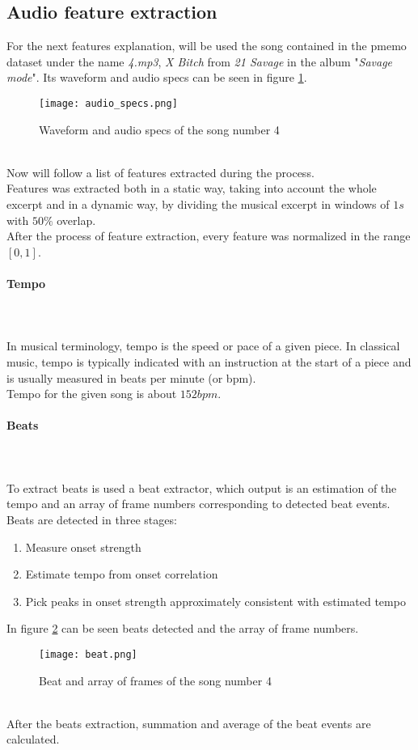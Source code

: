 \subsection{Audio feature extraction}
For the next features explanation, will be used the song contained in the \gls{pmemo} dataset under the name \textit{4.mp3}, \textit{X Bitch} from \textit{21 Savage} in the album "\textit{Savage mode}". Its waveform and audio specs can be seen in figure \ref{fig:audio_specs}.
\begin{figure}[h]
    \centering
    \texttt{[image: audio\_specs.png]} 
	\caption{Waveform and audio specs of the song number 4}
    \label{fig:audio_specs}
\end{figure}
\\
Now will follow a list of features extracted during the process.
\\
Features was extracted both in a static way, taking into account the whole excerpt and in a dynamic way, by dividing the musical excerpt in windows of $1s$ with $50\%$ overlap.
\\
After the process of feature extraction, every feature was normalized in the range $[0,1]$.
\paragraph{Tempo}
\mbox{} \\ \\
In musical terminology, tempo  is the speed or pace of a given piece. In classical music, tempo is typically indicated with an instruction at the start of a piece and is usually measured in beats per minute (or bpm).
\\
Tempo for the given song is about $152 bpm$.

\paragraph{Beats}
\mbox{} \\ \\
To extract beats is used a beat extractor, which output is an estimation of the tempo and an array of frame numbers corresponding to detected beat events.
\\
Beats are detected in three stages:
\begin{enumerate}	
	\item Measure onset strength
	\item Estimate tempo from onset correlation
	\item Pick peaks in onset strength approximately consistent with estimated tempo
\end{enumerate}
In figure \ref{fig:beat} can be seen beats detected and the array of frame numbers.
\begin{figure}[h]
    \centering
    \texttt{[image: beat.png]} 
	\caption{Beat and array of frames of the song number 4}
    \label{fig:beat}
\end{figure}
\\
After the beats extraction, summation and average of the beat events are calculated.

